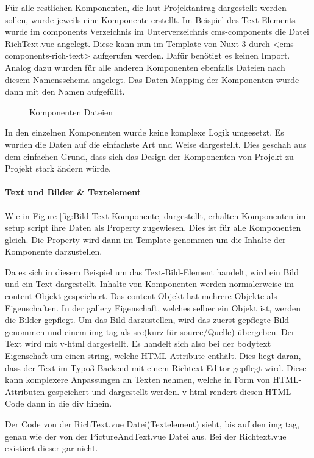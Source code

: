 Für alle restlichen Komponenten, die laut Projektantrag dargestellt werden sollen, wurde jeweils eine Komponente erstellt. Im Beispiel des Text-Elements wurde im components Verzeichnis im Unterverzeichnis cms-components die Datei RichText.vue angelegt. Diese kann nun im Template von Nuxt 3 durch <cms-components-rich-text> aufgerufen werden. Dafür benötigt es keinen Import. Analog dazu wurden für alle anderen Komponenten ebenfalls Dateien nach diesem Namensschema angelegt. Das Daten-Mapping der Komponenten wurde dann mit den Namen aufgefüllt.

\begin{figure}[htb]
\centering
{}
\caption{Komponenten Dateien}
\end{figure}

In den einzelnen Komponenten wurde keine komplexe Logik umgesetzt. Es wurden die Daten auf die einfachste Art und Weise dargestellt. Dies geschah aus dem einfachen Grund, dass sich das Design der Komponenten von Projekt zu Projekt stark ändern würde. 

\paragraph{Text und Bilder \& Textelement}

Wie in Figure \ref{fig:Bild-Text-Komponente} dargestellt, erhalten Komponenten im setup script ihre Daten als Property zugewiesen. Dies ist für alle Komponenten gleich. Die Property wird dann im Template genommen um die Inhalte der Komponente darzustellen. 

Da es sich in diesem Beispiel um das Text-Bild-Element handelt, wird ein Bild und ein Text dargestellt. Inhalte von Komponenten werden normalerweise im content Objekt gespeichert. Das content Objekt hat mehrere Objekte als Eigenschaften. In der gallery Eigenschaft, welches selber ein Objekt ist, werden die Bilder gepflegt. Um das Bild darzustellen, wird das zuerst gepflegte Bild genommen und einem img tag als src(kurz für source/Quelle) übergeben. Der Text wird mit v-html dargestellt. Es handelt sich also bei der bodytext Eigenschaft um einen string, welche HTML-Attribute enthält. Dies liegt daran, dass der Text im Typo3 Backend mit einem Richtext Editor gepflegt wird. Diese kann komplexere Anpassungen an Texten nehmen, welche in Form von HTML-Attributen gespeichert und dargestellt werden. v-html rendert diesen HTML-Code dann in die div hinein. 

Der Code von der RichText.vue Datei(Textelement) sieht, bis auf den img tag, genau wie der von der PictureAndText.vue Datei aus. Bei der Richtext.vue existiert dieser gar nicht.

